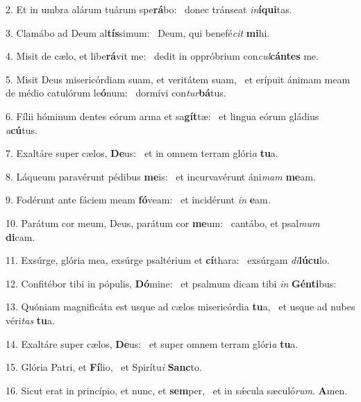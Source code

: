 2. Et in umbra alárum tuárum spe\textbf{rá}bo: \ast\  donec tránseat \textit{in}\textbf{í}\textbf{qui}tas.\

3. Clamábo ad Deum al\textbf{tís}simum: \ast\  Deum, qui benefé\textit{cit} \textbf{mi}hi.\

4. Misit de cælo, et libe\textbf{rá}vit me: \ast\  dedit in oppróbrium con\textit{cul}\textbf{cán}\textbf{tes} me.\

5. Misit Deus misericórdiam suam, et veritátem suam, \dag\  et erípuit ánimam meam de médio catulórum le\textbf{ó}num: \ast\  dormívi con\textit{tur}\textbf{bá}tus.\

6. Fílii hóminum dentes eórum arma et sa\textbf{gít}tæ: \ast\  et lingua eórum gládius \textit{a}\textbf{cú}tus.\

7. Exaltáre super cælos, \textbf{De}us: \ast\  et in omnem terram glóri\textit{a} \textbf{tu}a.\

8. Láqueum paravérunt pédibus \textbf{me}is: \ast\  et incurvavérunt áni\textit{mam} \textbf{me}am.\

9. Fodérunt ante fáciem meam \textbf{fó}veam: \ast\  et incidérunt \textit{in} \textbf{e}am.\

10. Parátum cor meum, Deus, parátum cor \textbf{me}um: \ast\  cantábo, et psal\textit{mum} \textbf{di}cam.\

11. Exsúrge, glória mea, exsúrge psaltérium et \textbf{cí}thara: \ast\  exsúrgam \textit{di}\textbf{lú}\textbf{cu}lo.\

12. Confitébor tibi in pópulis, \textbf{Dó}mine: \ast\  et psalmum dicam tibi \textit{in} \textbf{Gén}\textbf{ti}bus:\

13. Quóniam magnificáta est usque ad cælos misericórdia \textbf{tu}a, \ast\  et usque ad nubes véri\textit{tas} \textbf{tu}a.\

14. Exaltáre super cælos, \textbf{De}us: \ast\  et super omnem terram glóri\textit{a} \textbf{tu}a.\

15. Glória Patri, et \textbf{Fí}lio, \ast\  et Spirítu\textit{i} \textbf{Sanc}to.\

16. Sicut erat in princípio, et nunc, et \textbf{sem}per, \ast\  et in sǽcula sæculó\textit{rum}. \textbf{A}men.\

